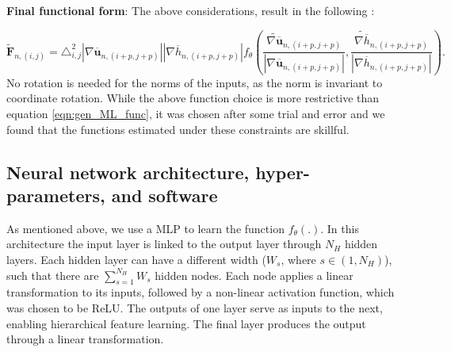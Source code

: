 \documentclass[draft]{agujournal2019}
\begin{document}


\textbf{Final functional form}: The above considerations, result in the following : 

\begin{equation}
    \mathbf{\widetilde{F}}_{n, (i,j)} = 
    \triangle_{i,j}^2  
    |\nabla \overline{\mathbf{u}}_{n, (i+p, j+p)}| 
    |\nabla \overline{h}_{n, (i+p, j+p)}|
    f_\theta\left(
    \frac{\widetilde{\nabla \overline{\mathbf{u}}}_{n, (i+p, j+p)}}{|\nabla \overline{\mathbf{u}}_{n, (i+p, j+p)}|},
    \frac{\widetilde{\nabla \overline{h}}_{n, (i+p, j+p)}}{|\nabla \overline{h}_{n, (i+p, j+p)}|} \right) .
    \label{eqn:final_functional_form}
\end{equation}
No rotation is needed for the norms of the inputs, as the norm is invariant to coordinate rotation.
While the above function choice is more restrictive than equation \ref{eqn:gen_ML_func}, it was chosen after some trial and error and we found that the functions estimated under these constraints are skillful. %


\subsection{Neural network architecture, hyper-parameters, and software}
As mentioned above, we use a MLP to learn the function $f_\theta(.)$. In this architecture the input layer is linked to the output layer through $N_H$ hidden layers. Each hidden layer can have a different width ($W_s$, where $s \in (1, N_H)$), such that there are $\sum_{s=1}^{N_H} W_s$ hidden nodes. Each node applies a linear transformation to its inputs, followed by a non-linear activation function, which was chosen to be ReLU. The outputs of one layer serve as inputs to the next, enabling hierarchical feature learning. The final layer produces the output through a linear transformation.
\end{document}
